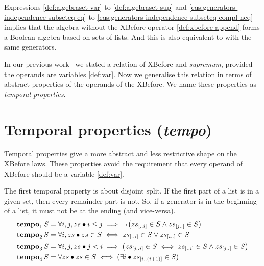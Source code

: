\documentclass[12pt,openright,twoside,a4paper,oldfontcommands,english,brazil,draft]{abntex2}
\newcommand{\todo}[1]{\adnote{#1}}
\theoremstyle{theo}
\newcommand{\sliceright}[2]{\ensuremath #1_{\left[..#2\right]}}
\newcommand{\sliceleft}[2]{\ensuremath #1_{\left[#2..\right]}}
\newcommand{\slice}[3]{\ensuremath #1_{\left[#2..#3\right]}}
\def\tempotext{tempo\xspace}
\def\tempoop{\ensuremath\operatorname{\mathbf{tempo}}}
\newcommand{\tempo}[2][1-4]{\ensuremath\tempoop_{#1} #2}
\begin{document}
Expressions \eqref{def:algebraset-var} to \eqref{def:algebraset-sup} and \eqref{eqs:generators-independence-subseteq-eq} to \eqref{eqs:generators-independence-subseteq-compl-neq} implies that the \ac{algebra} without the XBefore operator \eqref{def:xbefore-append} forms a Boolean algebra based on sets of lists.
And this is also equivalent to  with the same generators.

In our previous work~\cite{DM2015} we stated a relation of XBefore and \emph{supremum}, provided the operands are variables \eqref{def:var}.
Now we generalise this relation in terms of abstract properties of the operands of the XBefore.
We name these properties as \emph{temporal properties}.

\section{Temporal properties (\emph{\tempotext})}
\label{sec:temporal-properties}

Temporal properties give a more abstract and less restrictive shape\todo{touch?} on the XBefore laws.
These properties avoid the requirement that every operand of XBefore should be a variable \eqref{def:var}.

The first temporal property is about disjoint split.
If the first part of a list is in a given set, then every remainder part is not.
So, if a generator is in the beginning of a list, it must not be at the ending (and vice-versa).
%
%
\begin{subequations}
\begin{align}
\tempo[1]{S} &= \forall i, j, zs \bullet
  i \le j \implies
  \lnot \left(
    \sliceright{zs}{i} \in S \land \sliceleft{zs}{j} \in S
  \right)\label{def:tempo1}\\
\tempo[2]{S} &= \forall i, zs \bullet
  zs \in S \iff
  \sliceright{zs}{i} \in S \lor \sliceleft{zs}{i} \in S\label{def:tempo2}\\
\tempo[3]{S} &= \forall i, j, zs \bullet
  j < i \implies
  \left(
    \slice{zs}{j}{i} \in S \iff \sliceright{zs}{i} \in S \land \sliceleft{zs}{j} \in S
  \right)\label{def:tempo3}\\
\tempo[4]{S} &= \forall zs \bullet zs \in S \iff (\exists i \bullet \slice{zs}{i}{\left(i+1\right)} \in S)\label{def:tempo4}
\end{align}
\end{subequations}
\end{document}
